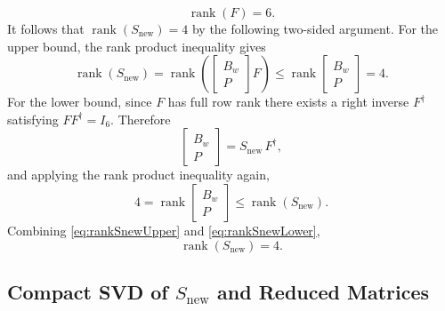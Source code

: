 \documentclass[11pt]{article}
\newcommand{\rank}{\operatorname{rank}}
\begin{document}
\begin{equation}
    \rank(F) = 6.
    \label{eq:rankF}
\end{equation}
It follows that $\rank(S_{\mathrm{new}}) = 4$ by the following two-sided
argument. For the upper bound, the rank product inequality gives
\begin{equation}
    \rank(S_{\mathrm{new}})
    = \rank\!\left(
        \begin{bmatrix} B_w \\ P \end{bmatrix} F
      \right)
    \leq
    \rank\!\begin{bmatrix} B_w \\ P \end{bmatrix}
    = 4.
    \label{eq:rankSnewUpper}
\end{equation}
For the lower bound, since $F$ has full row rank there exists a right inverse
$F^\dagger$ satisfying $F F^\dagger = I_6$. Therefore
\begin{equation}
    \begin{bmatrix} B_w \\ P \end{bmatrix}
    = S_{\mathrm{new}}\, F^\dagger,
    \label{eq:rightinverse}
\end{equation}
and applying the rank product inequality again,
\begin{equation}
    4 = \rank\!\begin{bmatrix} B_w \\ P \end{bmatrix}
    \leq \rank(S_{\mathrm{new}}).
    \label{eq:rankSnewLower}
\end{equation}
Combining \eqref{eq:rankSnewUpper} and \eqref{eq:rankSnewLower},
\begin{equation}
    \rank(S_{\mathrm{new}}) = 4.
    \label{eq:rankSnew}
\end{equation}


\subsection{Compact SVD of $S_{\mathrm{new}}$ and Reduced Matrices}
\end{document}
